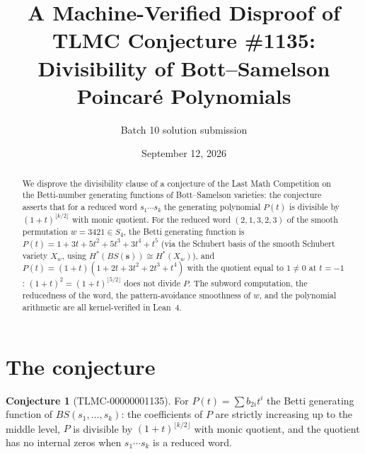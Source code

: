 \documentclass[11pt]{article}
\title{A Machine-Verified Disproof of TLMC Conjecture \#1135:\\ Divisibility of Bott--Samelson Poincaré Polynomials}
\author{Batch 10 solution submission}
\date{September 12, 2026}
\theoremstyle{definition}
\newtheorem{conjecture}[theorem]{Conjecture}
\theoremstyle{remark}
\begin{document}
\maketitle
\begin{abstract}
We disprove the divisibility clause of a conjecture of the Last Math Competition on the Betti-number generating functions of Bott--Samelson varieties: the conjecture asserts that for a reduced word $s_1\cdots s_k$ the generating polynomial $P(t)$ is divisible by $(1+t)^{\lfloor k/2\rfloor}$ with monic quotient. For the reduced word $(2,1,3,2,3)$ of the smooth permutation $w = 3421 \in S_4$, the Betti generating function is $P(t) = 1+3t+5t^2+5t^3+3t^4+t^5$ (via the Schubert basis of the smooth Schubert variety $X_w$, using $H^*(BS(\mathbf{s})) \cong H^*(X_w)$), and $P(t) = (1+t)(1+2t+3t^2+2t^3+t^4)$ with the quotient equal to $1 \ne 0$ at $t = -1$: $(1+t)^2 = (1+t)^{\lfloor 5/2\rfloor}$ does not divide $P$. The subword computation, the reducedness of the word, the pattern-avoidance smoothness of $w$, and the polynomial arithmetic are all kernel-verified in Lean~4.
\end{abstract}
\section{The conjecture}
\begin{conjecture}[TLMC-00000001135]\label{conj:1135}
For $P(t) = \sum b_{2i}t^i$ the Betti generating function of $BS(s_1,\dots,s_k)$: the coefficients of $P$ are strictly increasing up to the middle level, $P$ is divisible by $(1+t)^{\lfloor k/2\rfloor}$ with monic quotient, and the quotient has no internal zeros when $s_1\cdots s_k$ is a reduced word.
\end{conjecture}
\end{document}
